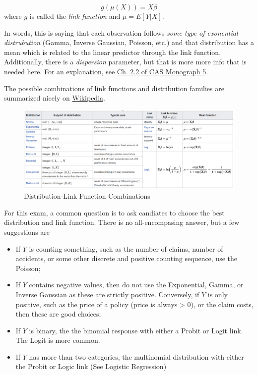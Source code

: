 \documentclass[openany]{book}
\providecommand{\tightlist}{%
  \setlength{\itemsep}{0pt}\setlength{\parskip}{0pt}}
\begin{document}
\[g(\mu(X)) = X\beta\]
where \(g\) is called the \emph{link function} and \(\mu = E[Y|X]\).

In words, this is saying that each observation follows \emph{some type of exonential distrubution} (Gamma, Inverse Gaussian, Poisson, etc.) and that distribution has a mean which is related to the linear predictor through the link function. Additionally, there is a \emph{dispersion} parameter, but that is more more info that is needed here. For an explanation, see \href{https://www.casact.org/pubs/monographs/papers/05-Goldburd-Khare-Tevet.pdf}{Ch. 2.2 of CAS Monograph 5}.

The possible combinations of link functions and distribution families are summarized nicely on \href{https://en.wikipedia.org/wiki/Generalized_linear_model\#Link_function}{Wikipedia}.

\begin{figure}
\includegraphics[width=22.32in]{images/glm_links} \caption{Distribution-Link Function Combinations}\label{fig:unnamed-chunk-14}
\end{figure}

For this exam, a common question is to ask candiates to choose the best distribution and link function. There is no all-encompasing answer, but a few suggestions are

\begin{itemize}
\tightlist
\item
  If \(Y\) is counting something, such as the number of claims, number of accidents, or some other discrete and positive counting sequence, use the Poisson;
\item
  If \(Y\) contains negative values, then do not use the Exponential, Gamma, or Inverse Gaussian as these are strictly positive. Conversely, if \(Y\) is only positive, such as the price of a policy (price is always \textgreater{} 0), or the claim costs, then these are good choices;
\item
  If \(Y\) is binary, the the binomial response with either a Probit or Logit link. The Logit is more common.
\item
  If \(Y\) has more than two categories, the multinomial distribution with either the Probit or Logic link (See Logistic Regression)
\end{itemize}
\end{document}
